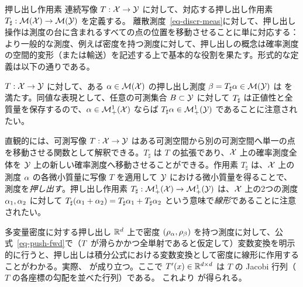 \begin{rem2}{押し出し作用素}\label{rem-push-f}
連続写像 $T : \mathcal{X} \rightarrow \mathcal{Y}$ に対して、対応する押し出し作用素 $T_\sharp : \mathcal{M}(\mathcal{X}) \rightarrow \mathcal{M}(\mathcal{Y})$ を定義する。
%
離散測度~\eqref{eq-discr-meas}に対して、押し出し操作は測度の台に含まれるすべての点の位置を移動させることに単に対応する：
より一般的な測度、例えば密度を持つ測度に対して、押し出しの概念は確率測度の空間的変形（または輸送）を記述する上で基本的な役割を果たす。形式的な定義は以下の通りである。

\begin{defn}[押し出し]\label{defn-pushfwd}
$T : \mathcal{X} \rightarrow \mathcal{Y}$ に対して、ある $\alpha \in \mathcal{M}(\mathcal{X})$ の押し出し測度 $\beta = T_\sharp \alpha \in \mathcal{M}(\mathcal{Y})$ は
を満たす。同値な表現として、任意の可測集合 $B \subset \mathcal{Y}$ に対して
$T_\sharp$ は正値性と全質量を保存するので、$\alpha \in \mathcal{M}_+^1(\mathcal{X})$ ならば $T_\sharp \alpha \in \mathcal{M}_+^1(\mathcal{Y})$ であることに注意されたい。
\end{defn}

直観的には、可測写像 $T: \mathcal{X}\rightarrow \mathcal{Y}$ はある可測空間から別の可測空間へ単一の点を移動させる関数として解釈できる。$T_\sharp$ は $T$ の拡張であり、$\mathcal{X}$ 上の確率測度全体を $\mathcal{Y}$ 上の新しい確率測度へ移動させることができる。作用素 $T_\sharp$ は、$\mathcal{X}$ 上の測度 $\alpha$ の各微小質量に写像 $T$ を適用して $\mathcal{Y}$ における微小質量を得ることで、測度を\emph{押し出す}。押し出し作用素 $T_\sharp : \mathcal{M}_+^1(\mathcal{X}) \rightarrow \mathcal{M}_+^1(\mathcal{Y})$ は、$\mathcal{X}$ 上の2つの測度 $\alpha_1,\alpha_2$ に対して $T_\sharp(\alpha_1+\alpha_2)=T_\sharp\alpha_1+ T_\sharp\alpha_2$ という意味で\emph{線形}であることに注意されたい。
\end{rem2}

\begin{rem2}{多変量密度に対する押し出し}
$\mathbb{R}^d$ 上で密度 $(\rho_{\alpha},\rho_{\beta})$ を持つ測度に対して、公式~\eqref{eq-push-fwd}で（$T$ が滑らかかつ全単射であると仮定して）変数変換を明示的に行うと、押し出しは積分公式における変数変換として密度に線形に作用することがわかる。実際、
が成り立つ。ここで $T'(x) \in \mathbb{R}^{d \times d}$ は $T$ の Jacobi 行列（$T$ の各座標の勾配を並べた行列）である。
これより
が得られる。
\end{rem2}


